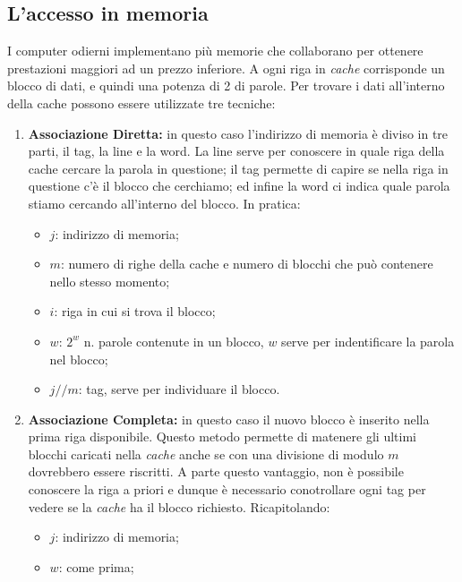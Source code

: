 \documentclass{article}
\begin{document}
\subsection{L'accesso in memoria}

I computer odierni implementano più memorie che collaborano per ottenere prestazioni maggiori ad un prezzo inferiore. A ogni riga in \textit{cache} corrisponde un blocco di dati, e quindi una potenza di 2 di parole. Per trovare i dati all'interno della cache possono essere utilizzate tre tecniche:
\begin{enumerate}
	\item \label{Directmapping} \textbf{Associazione Diretta:} in questo caso l'indirizzo di memoria è diviso in tre parti, il tag, la line e la word. La line serve per conoscere in quale riga della cache cercare la parola in questione; il tag permette di capire se nella riga in questione c'è il blocco che cerchiamo; ed infine la word ci indica quale parola stiamo cercando all'interno del blocco. In pratica:
	\begin{itemize}
		\item $j$: indirizzo di memoria;

		\item $m$: numero di righe della cache e numero di blocchi che può contenere nello stesso momento;

		\item $i$: riga in cui si trova il blocco;

		\item $w$: $2^w$ n. parole contenute in un blocco, $w$ serve per indentificare la parola nel blocco;

		\item $j//m$: tag, serve per individuare il blocco.
	\end{itemize}

	\item \label{Associativemapping} \textbf{Associazione Completa:} in questo caso il nuovo blocco è inserito nella prima riga disponibile. Questo metodo permette di matenere gli ultimi blocchi caricati nella \textit{cache} anche se con una divisione di modulo $m$ dovrebbero essere riscritti. A parte questo vantaggio, non è possibile conoscere la riga a priori e dunque è necessario conotrollare ogni tag per vedere se la \textit{cache} ha il blocco richiesto. Ricapitolando:
	\begin{itemize}
		\item $j$: indirizzo di memoria;

		\item $w$: come prima;


\end{itemize}
\end{enumerate}
\end{document}
